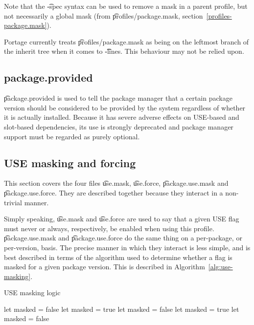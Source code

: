 Note that the \t{-spec} syntax can be used to remove a mask in a parent profile, but not
necessarily a global mask (from \t{profiles/package.mask}, section~\ref{profiles-package.mask}).

\note Portage currently treats \t{profiles/package.mask} as being on the leftmost branch of the
    inherit tree when it comes to \t{-lines}. This behaviour may not be relied upon.

\subsection{package.provided}
\t{package.provided} is used to tell the package manager that a certain package version should be
considered to be provided by the system regardless of whether it is actually installed. Because it
has severe adverse effects on USE-based and slot-based dependencies, its use is strongly deprecated
and package manager support must be regarded as purely optional.

\subsection{USE masking and forcing}
\label{use-masking}
This section covers the four files \t{use.mask}, \t{use.force}, \t{package.use.mask} and
\t{package.use.force}. They are described together because they interact in a non-trivial manner.

Simply speaking, \t{use.mask} and \t{use.force} are used to say that a given USE flag must never or
always, respectively, be enabled when using this profile. \t{package.use.mask} and
\t{package.use.force} do the same thing on a per-package, or per-version, basis. The precise manner
in which they interact is less simple, and is best described in terms of the algorithm used to
determine whether a flag is masked for a given package version. This is described in Algorithm~\ref{alg:use-masking}.
\begin{algorithm}
\caption{USE masking logic} \label{alg:use-masking}
\begin{algorithmic}[1]
\STATE let masked = false
        \STATE let masked = true
        \STATE let masked = false
    \ENDIF
            \STATE let masked = true
            \STATE let masked = false
        \ENDIF
    \ENDFOR
\ENDFOR
\end{algorithmic}
\end{algorithm}

